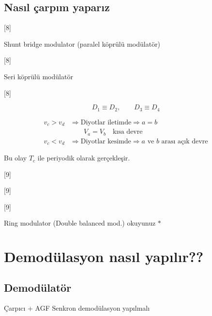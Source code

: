 \documentclass[11pt,a4paper]{article}
\begin{document}
\subsection{Nasıl çarpım yaparız}
[8]

Shunt bridge modulator (paralel köprülü modülatör)

[8]

Seri köprülü modülatör

[8]

\[ D_1 \equiv D_2, \qquad D_3 \equiv D_4 \]

\begin{align*}
v_c > v_d &\Rightarrow \text{Diyotlar iletimde} \Rightarrow a = b\\
&\qquad V_a = V_b \quad \text{kısa devre}\\
v_c < v_d &\Rightarrow \text{Diyotlar kesimde} \Rightarrow a \text{ ve } b \text{ arası açık devre}
\end{align*}

Bu olay $T_c$ ile periyodik olarak gerçekleşir.

[9]

[9]

\begin{center}
\end{center}

[9]

Ring modulator (Double balanced mod.) okuyunuz $\ast$

\section{Demodülasyon  nasıl yapılır??}

\subsection{Demodülatör}
Çarpıcı + AGF \hfill Senkron demodülasyon yapılmalı
\end{document}
